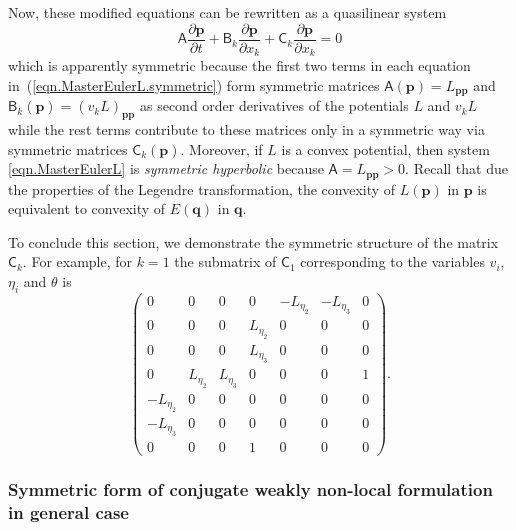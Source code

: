 \documentclass[twoside]{article}
\newcommand{\qq}{{\boldsymbol{q}}}
\newcommand{\pp}{{\boldsymbol{p}}}
\newcommand{\ted}{E} %
\newcommand{\pd}{\partial}
\begin{document}
Now, these modified equations can be rewritten as a quasilinear system
\begin{equation}\label{eqn.symm.quasilinear}
\mathsf{A}\frac{\pd \pp}{\pd t} + \mathsf{B}_k \frac{\pd \pp}{\pd x_k} + 
\mathsf{C}_k\frac{\pd \pp}{\pd x_k} = 0 
\end{equation}
which is apparently symmetric because the first two terms in each 
equation in~(\ref{eqn.MasterEulerL.symmetric}) form symmetric matrices $ 
\mathsf{A}(\pp)=L_{\pp\pp} $ and $ \mathsf{B}_k(\pp) = 
(v_k 
L)_{\pp\pp} $ as 
second order derivatives of the potentials $ L $ and 
$ v_k L $ while the rest terms contribute to these matrices only in a symmetric 
way via symmetric matrices $ \mathsf{C}_k(\pp) $. Moreover, if $ L $ is a 
convex 
potential, then system 
\eqref{eqn.MasterEulerL} is \textit{symmetric hyperbolic} because $ \mathsf{A} 
= L_{\pp\pp} > 0 $. Recall that due the 
properties of the Legendre transformation, the convexity of $ L(\pp) $ in $ \pp 
$ is equivalent to convexity of $ \ted(\qq) $ in $ \qq $. 

To conclude this section, we demonstrate the symmetric structure of the matrix 
$ \mathsf{C}_k $. For example, for $ k=1 $ the submatrix of $ \mathsf{C}_1 $ 
corresponding to the variables $ v_i $, $ \eta_i $ and $ \theta $  is 
\begin{equation}
\left(
\begin{array}{ccccccc}
0      &      0      & 0 &      0      & -L_{\eta _2} &   -L_{\eta_3} & 0\\
0      &      0      & 0 & L_{\eta _2} &      0  &  0      & 0 \\
0      &      0      & 0 & L_{\eta _3} &      0    &       0  & 0     \\
	     0       & L_{\eta _2} & L_{\eta _3} & 0 &      0      &      0       
	     &       1       \\
	-L_{\eta _2} &      0      &      0      & 0 &      0      &      0       
	&       0       \\
	-L_{\eta _3} &      0      &      0      & 0 &      0      &      0       
	&       0\\
0      &      0      & 0 &      1      &      0    	     &       0  & 0
\end{array}
\right).
\end{equation}




\subsubsection{Symmetric form of conjugate weakly non-local formulation in 
general case}
\label{sec.euler.symmhyp}
\end{document}
